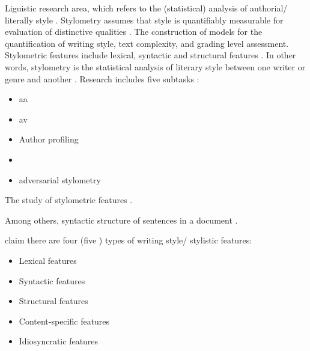 \begin{definition}
    [Stylometry]
    Liguistic research area, which refers to the (statistical) analysis of authorial/ literally style \cite{elmanarelbouanani_authorship_2014,neal_surveying_2018}.
    Stylometry assumes that style is quantifiably measurable for evaluation of distinctive qualities \cite{neal_surveying_2018}.
    The construction of models for the quantification of writing style, text complexity, and grading level assessment.
    Stylometric features include lexical, syntactic and structural features \cite{stein_intrinsic_2011}.
    In other words, stylometry is the statistical analysis of literary style between one writer or genre and another \cite{tyo_state_2022}.
    Research includes five subtasks \cite{neal_surveying_2018}:
    \begin{itemize}
        \item \ac{aa}
        \item \ac{av}
        \item Author profiling
        \item {}
        \item adversarial stylometry
    \end{itemize}
\end{definition}

\begin{definition}
    [Stylistics]
    The study of stylometric features \cite{elmanarelbouanani_authorship_2014,abbasi_writeprints_2008}.
\end{definition}

\begin{definition}
    Among others, syntactic structure of sentences in a document \cite{jafariakinabad_self_supervised_2022}.
\end{definition}

\citet{elmanarelbouanani_authorship_2014} claim there are four (five \cite{abbasi_writeprints_2008}) types of writing style/ stylistic features:
\begin{itemize}
    \item Lexical features \citet{elmanarelbouanani_authorship_2014,abbasi_writeprints_2008}
    \item Syntactic features \citet{elmanarelbouanani_authorship_2014,abbasi_writeprints_2008}
    \item Structural features \citet{elmanarelbouanani_authorship_2014,abbasi_writeprints_2008}
    \item Content-specific features \citet{elmanarelbouanani_authorship_2014,abbasi_writeprints_2008}
    \item Idiosyncratic features \citet{abbasi_writeprints_2008}
\end{itemize}

